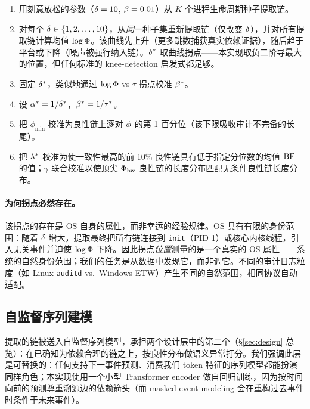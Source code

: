 \begin{enumerate}
\item 用刻意放松的参数（$\delta=10$, $\beta=0.01$）从 $K$ 个进程生命周期种子提取链。
\item 对每个 $\delta \in \{1, 2, \dots, 10\}$，从\emph{同一}种子集重新提取链（仅改变 $\delta$），并对所有提取链计算均值 $\log \Phi$。该曲线先上升（更多跳数捕获真实依赖证据），随后趋于平台或下降（噪声被强行纳入链）。$\delta^*$ 取曲线拐点——本实现取负二阶导最大的位置，但任何标准的 knee-detection 启发式都足够。
\item 固定 $\delta^*$，类似地通过 $\log \Phi$-vs-$\tau$ 拐点校准 $\beta^*$。
\item 设 $\alpha^* = 1/\delta^*$，$\beta^* = 1/\tau^*$。
\item 把 $\phi_{\min}$ 校准为良性链上逐对 $\phi$ 的第 1 百分位（该下限吸收审计不完备的长尾）。
\item 把 $\lambda^*$ 校准为使一致性最高的前 10\% 良性链具有低于指定分位数的均值 $\operatorname{BF}$ 的值；$\gamma$ 联合校准以使顶尖 $\Phi_{\text{bw}}$ 良性链的长度分布匹配无条件良性链长度分布。
\end{enumerate}

\paragraph{为何拐点必然存在。}该拐点的存在是 OS 自身的属性，而非幸运的经验规律。OS 具有有限的身份范围：随着 $\delta$ 增大，提取最终把所有链连接到 \texttt{init}（PID 1）或核心内核线程，引入无关事件并迫使 $\log \Phi$ 下降。因此拐点\emph{位置}测量的是一个真实的 OS 属性——系统的自然身份范围；我们的任务是从数据中发现它，而非调它。不同的审计日志粒度（如 Linux \texttt{auditd} vs.\ Windows ETW）产生不同的自然范围，相同协议自动适配。

\subsection{自监督序列建模}
\label{sec:seq_model}

提取的链被送入自监督序列模型，承担两个设计层中的第二个（\S\ref{sec:design} 总览）：在已确知为依赖合理的链之上，按良性分布做语义异常打分。我们强调此层是可替换的：任何支持下一事件预测、消费我们 token 特征的序列模型都能扮演同样角色；本实现使用一个小型 Transformer encoder 做自回归训练，因为按时间向前的预测尊重溯源边的依赖箭头（而 masked event modeling 会在重构过去事件时条件于未来事件）。

